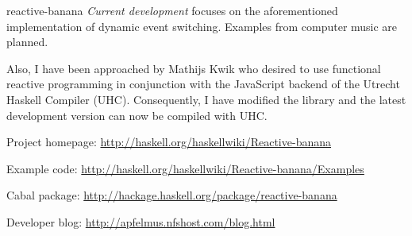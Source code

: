 \begin{hcarentry}[updated]{reactive-banana}
\emph{Current development} focuses on the aforementioned implementation of dynamic event switching. Examples from computer music are planned.

Also, I have been approached by Mathijs Kwik who desired to use functional reactive programming in conjunction with the JavaScript backend of the Utrecht Haskell Compiler (UHC). Consequently, I have modified the library and the latest development version can now be compiled with UHC.

\FurtherReading
\begin{compactitem}
\item Project homepage: \url{http://haskell.org/haskellwiki/Reactive-banana}
\item Example code: \url{http://haskell.org/haskellwiki/Reactive-banana/Examples}
\item Cabal package: \url{http://hackage.haskell.org/package/reactive-banana}
\item Developer blog:  \url{http://apfelmus.nfshost.com/blog.html}
\end{compactitem}
\end{hcarentry}
